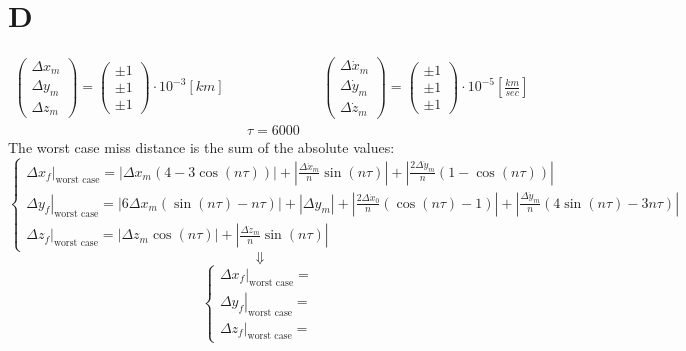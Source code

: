 \documentclass[11pt, a4paper]{article}
\begin{document}
\section{D}
\begin{equation*}
    \begin{matrix}
        \left(\begin{array}{c}
            \Delta x_m \\ \Delta y_m \\ \Delta z_m
        \end{array}\right) = \left(\begin{array}{c}
            \pm 1 \\
            \pm 1 \\
            \pm 1
        \end{array}\right)\cdot10^{-3}\left[km\right] &&&& \left(\begin{array}{c}
            \Delta \dot{x}_m \\ \Delta \dot{y}_m \\ \Delta \dot{z}_m
        \end{array}\right) = \left(\begin{array}{c}
            \pm 1 \\
            \pm 1 \\
            \pm 1
        \end{array}\right)\displaystyle\cdot10^{-5}\left[\frac{km}{sec}\right] \\
        &&\tau = 6000&& 
    \end{matrix}
\end{equation*}
The worst case miss distance is the sum of the absolute values:
\begin{equation}
    \left\{\begin{array}{l}
        \displaystyle\left.\Delta x_f\right|_\text{worst case} = \left|\Delta x_m\left(4-3\cos(n\tau)\right)\right| + \left|\frac{\Delta\dot{x}_m}{n}\sin(n\tau)\right| + \left|\frac{2\Delta\dot{y}_m}{n}\left(1-\cos(n\tau)\right)\right| \\
        \displaystyle\left.\Delta y_f\right|_\text{worst case} = \left|6\Delta x_m\left(\sin(n\tau)-n\tau\right)\right| + \left|\Delta y_m\right| + \left|\frac{2\Delta\dot{x}_0}{n}\left(\cos(n\tau)-1\right)\right| + \left|\frac{\Delta\dot{y}_m}{n}\left(4\sin(n\tau)-3n\tau\right)\right| \\
        \displaystyle\left.\Delta z_f\right|_\text{worst case} = \left|\Delta z_m\cos(n\tau)\right| + \left|\frac{\Delta\dot{z}_m}{n}\sin(n\tau)\right|
    \end{array}\right.
\end{equation}
\begin{equation*}
    \Downarrow
\end{equation*}
\begin{equation}
    \left\{\begin{array}{l}
        \displaystyle\left.\Delta x_f\right|_\text{worst case} = \\
        \displaystyle\left.\Delta y_f\right|_\text{worst case} = \\ 
        \displaystyle\left.\Delta z_f\right|_\text{worst case} = 
    \end{array}\right.
\end{equation}
\end{document}
